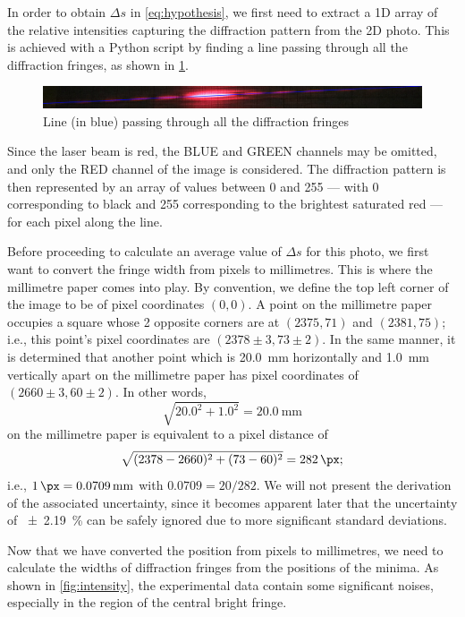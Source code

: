 \documentclass[a4paper, 12pt]{article}
\begin{document}
In order to obtain $\Delta s$ in \cref{eq:hypothesis}, we first need to extract a 1D array of the relative intensities capturing the diffraction pattern from the 2D photo. 
This is achieved with a Python script \autocite{py_extract} by finding a line passing through all the diffraction fringes, as shown in \cref{fig:processed-axis}.

\begin{figure}[H]
    \includegraphics[width=\textwidth]{scripts/processed-data/axis}
    \caption{Line (in blue) passing through all the diffraction fringes}
    \label{fig:processed-axis}
\end{figure}

Since the laser beam is red, the BLUE and GREEN channels may be omitted, and only the RED channel of the image is considered. 
The diffraction pattern is then represented by an array of values between 0 and 255 --- with 0 corresponding to black and 255 corresponding to the brightest saturated red --- for each pixel along the line. 

Before proceeding to calculate an average value of $\Delta s$ for this photo, we first want to convert the fringe width from pixels to millimetres. 
This is where the millimetre paper comes into play. 
By convention, we define the top left corner of the image to be of pixel coordinates $(0, 0)$. 
A point on the millimetre paper occupies a square whose 2 opposite corners are at $(2375, 71)$ and $(2381, 75)$; 
i.e., this point's pixel coordinates are $(2378 \pm 3, 73 \pm 2)$. 
In the same manner, it is determined that another point which is \SI{20.0}{\mm} horizontally and \SI{1.0}{\mm} vertically apart on the millimetre paper has pixel coordinates of $(2660 \pm 3, 60 \pm 2)$. 
In other words, 
\[ \sqrt{20.0^2 + 1.0^2} = \SI{20.0}{\mm} \]
on the millimetre paper is equivalent to a pixel distance of
\[ \sqrt{ (2378 - 2660)^2 + (73 - 60)^2 } = \SI{282}{\px}; \]
i.e., $\SI{1}{\px} = \SI{0.0709}{\mm}$ with $0.0709 = 20 / 282$.
We will not present the derivation of the associated uncertainty, since it becomes apparent later that the uncertainty of \SI{+-2.19}{\%} can be safely ignored due to more significant standard deviations.

Now that we have converted the position from pixels to millimetres, we need to calculate the widths of diffraction fringes from the positions of the minima. 
As shown in \cref{fig:intensity}, the experimental data contain some significant noises, especially in the region of the central bright fringe. 
\end{document}
